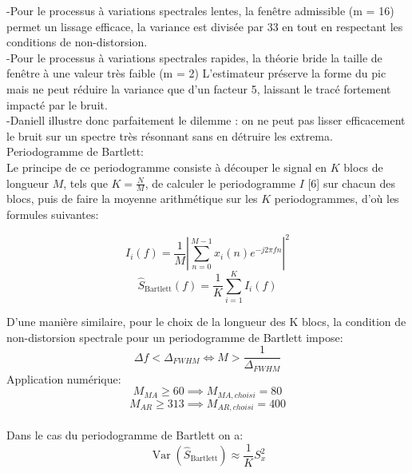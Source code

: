 \documentclass[11pt,a4paper]{article}
\begin{document}
    -Pour le processus à variations spectrales lentes, la fenêtre admissible (m = 16) permet un lissage efficace, la variance est divisée par 33 en tout en respectant les conditions de non-distorsion.\\
    \indent -Pour le processus à variations spectrales rapides, la théorie bride la taille de fenêtre à une valeur très faible (m = 2) L'estimateur préserve la forme du pic mais ne peut réduire la variance que d'un facteur 5, laissant le tracé fortement impacté par le bruit.\\
    \indent -Daniell illustre donc parfaitement le dilemme : on ne peut pas lisser efficacement le bruit sur un spectre très résonnant sans en détruire les extrema.\\

Periodogramme de Bartlett:
\\
Le principe de ce periodogramme consiste à découper le signal en $K$ blocs de longueur $M$, tels que $K = \frac{N}{M}$, de calculer le periodogramme $I$ [6] sur chacun des blocs, puis de faire la moyenne arithmétique sur les $K$ periodogrammes, d'où les formules suivantes:

\begin{equation}
    I_i(f) = \frac{1}{M} \left| \sum_{n=0}^{M-1} x_i(n) e^{-j 2 \pi f n} \right|^2
\end{equation}
\begin{equation}
    \hat{S}_{\text{Bartlett}}(f) = \frac{1}{K} \sum_{i=1}^{K} I_i(f)
\end{equation}

D'une manière similaire, pour le choix de la longueur des K blocs, la condition de non-distorsion spectrale pour un periodogramme de Bartlett impose:
\begin{equation}
    \Delta f < {\Delta}_{FWHM}
    \iff M > \frac{1}{{\Delta}_{FWHM}}
\end{equation}
Application numérique:
\begin{equation}
    M_{MA} \ge 60 \implies M_{MA,choisi} = 80
\end{equation}
\begin{equation}
    M_{AR} \ge 313 \implies M_{AR, choisi} = 400
\end{equation}
\\
Dans le cas du periodogramme de Bartlett on a:
\begin{equation}
    \operatorname{Var}(\hat{S}_{\text{Bartlett}}) \approx \frac{1}{K} S_x^2
\end{equation}
\end{document}
